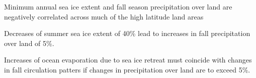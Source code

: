 \documentclass[draft,linenumbers]{agujournal}
\begin{document}





\begin{keypoints}
\item Minimum annual sea ice extent and fall season precipitation over land are negatively correlated across much of the high latitude land areas
\item Decreases of summer sea ice extent of 40\% lead to increases in fall precipitation over land of 5\%.
\item Increases of ocean evaporation due to sea ice retreat must coincide with changes in fall circulation patters if changes in precipitation over land are to exceed 5\%.
\end{keypoints}

%
%

\end{document}

